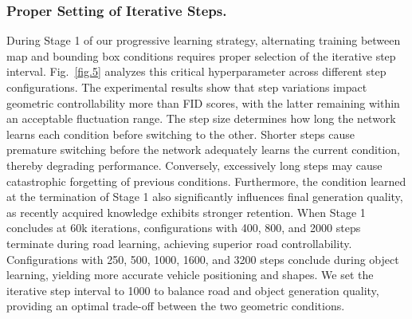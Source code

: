 \subsubsection{Proper Setting of Iterative Steps.}
During Stage 1 of our progressive learning strategy, alternating training between map and bounding box conditions requires proper selection of the iterative step interval. Fig.~\ref{fig.5} analyzes this critical hyperparameter across different step configurations.
The experimental results show that step variations impact geometric controllability more than FID scores, with the latter remaining within an acceptable fluctuation range.
The step size determines how long the network learns each condition before switching to the other. 
Shorter steps cause premature switching before the network adequately learns the current condition, thereby degrading performance.
Conversely, excessively long steps may cause catastrophic forgetting of previous conditions.
Furthermore, the condition learned at the termination of Stage 1 also significantly influences final generation quality, as recently acquired knowledge exhibits stronger retention. 
When Stage 1 concludes at 60k iterations, configurations with 400, 800, and 2000 steps terminate during road learning, achieving superior road controllability. Configurations with 250, 500, 1000, 1600, and 3200 steps conclude during object learning, yielding more accurate vehicle positioning and shapes.
We set the iterative step interval to 1000 to balance road and object generation quality, providing an optimal trade-off between the two geometric conditions.
